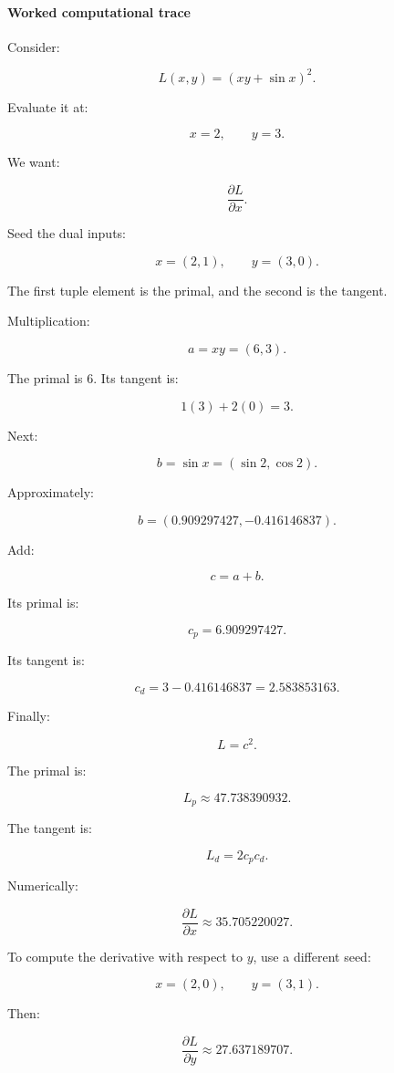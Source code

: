 \paragraph{Worked computational trace}\label{02-foundations-ii-ch022-worked-computational-trace}

Consider:

\[
L(x,y)=(xy+\sin x)^2.
\]

Evaluate it at:

\[
x=2,\qquad y=3.
\]

We want:

\[
\frac{\partial L}{\partial x}.
\]

Seed the dual inputs:

\[
x=(2,1),\qquad y=(3,0).
\]

The first tuple element is the primal, and the second is the tangent.

Multiplication:

\[
a=xy=(6,3).
\]

The primal is \(6\). Its tangent is:

\[
1(3)+2(0)=3.
\]

Next:

\[
b=\sin x = (\sin2,\cos2).
\]

Approximately:

\[
b=(0.909297427,-0.416146837).
\]

Add:

\[
c=a+b.
\]

Its primal is:

\[
c_p=6.909297427.
\]

Its tangent is:

\[
c_d=3-0.416146837 =2.583853163.
\]

Finally:

\[
L=c^2.
\]

The primal is:

\[
L_p\approx47.738390932.
\]

The tangent is:

\[
L_d=2c_pc_d.
\]

Numerically:

\[
\boxed{ \frac{\partial L}{\partial x} \approx35.705220027 }.
\]

To compute the derivative with respect to \(y\), use a different seed:

\[
x=(2,0),\qquad y=(3,1).
\]

Then:

\[
\boxed{ \frac{\partial L}{\partial y} \approx27.637189707 }.
\]

